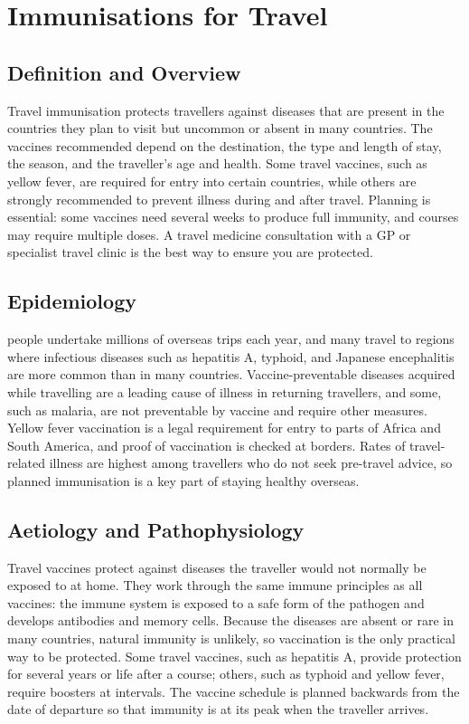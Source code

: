 \chapter{Immunisations for Travel}

\section*{Definition and Overview}
Travel immunisation protects travellers against diseases that are present in the countries they plan to visit but uncommon or absent in many countries. The vaccines recommended depend on the destination, the type and length of stay, the season, and the traveller's age and health. Some travel vaccines, such as yellow fever, are required for entry into certain countries, while others are strongly recommended to prevent illness during and after travel. Planning is essential: some vaccines need several weeks to produce full immunity, and courses may require multiple doses. A travel medicine consultation with a GP or specialist travel clinic is the best way to ensure you are protected.

\section*{Epidemiology}
people undertake millions of overseas trips each year, and many travel to regions where infectious diseases such as hepatitis A, typhoid, and Japanese encephalitis are more common than in many countries. Vaccine-preventable diseases acquired while travelling are a leading cause of illness in returning travellers, and some, such as malaria, are not preventable by vaccine and require other measures. Yellow fever vaccination is a legal requirement for entry to parts of Africa and South America, and proof of vaccination is checked at borders. Rates of travel-related illness are highest among travellers who do not seek pre-travel advice, so planned immunisation is a key part of staying healthy overseas.

\section*{Aetiology and Pathophysiology}
Travel vaccines protect against diseases the traveller would not normally be exposed to at home. They work through the same immune principles as all vaccines: the immune system is exposed to a safe form of the pathogen and develops antibodies and memory cells. Because the diseases are absent or rare in many countries, natural immunity is unlikely, so vaccination is the only practical way to be protected. Some travel vaccines, such as hepatitis A, provide protection for several years or life after a course; others, such as typhoid and yellow fever, require boosters at intervals. The vaccine schedule is planned backwards from the date of departure so that immunity is at its peak when the traveller arrives.

